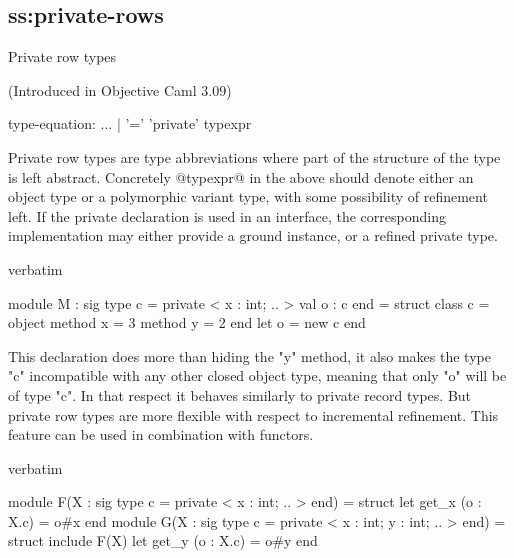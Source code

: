 \subsection{ss:private-rows}{Private row types}

(Introduced in Objective Caml 3.09)

\begin{syntax}
type-equation:
          ...
        | '=' 'private' typexpr
\end{syntax}

Private row types are type abbreviations where part of the
structure of the type is left abstract. Concretely @typexpr@ in the
above should denote either an object type or a polymorphic variant
type, with some possibility of refinement left. If the private
declaration is used in an interface, the corresponding implementation
may either provide a ground instance, or a refined private type.
\begin{camlexample}{verbatim}
\begin{caml}
\begin{camlinput}
module M : sig type c = private < x : int; .. > val o : c end =
struct
  class c = object method x = 3 method y = 2 end
  let o = new c
end
\end{camlinput}
\end{caml}
\end{camlexample}
This declaration does more than hiding the "y" method, it also makes
the type "c" incompatible with any other closed object type, meaning
that only "o" will be of type "c". In that respect it behaves
similarly to private record types. But private row types are
more flexible with respect to incremental refinement. This feature can
be used in combination with functors.
\begin{camlexample}{verbatim}
\begin{caml}
\begin{camlinput}
module F(X : sig type c = private < x : int; .. > end) =
struct
  let get_x (o : X.c) = o#x
end
module G(X : sig type c = private < x : int; y : int; .. > end) =
struct
  include F(X)
  let get_y (o : X.c) = o#y
end
\end{camlinput}
\end{caml}
\end{camlexample}

